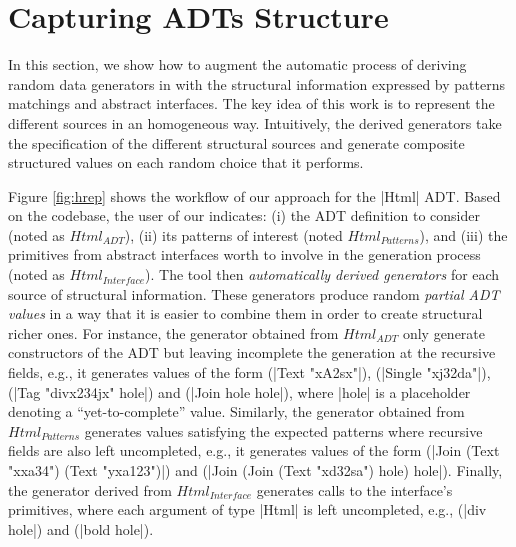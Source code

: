 \section{Capturing ADTs Structure} \label{sec:hrepcont}

\begin{figure*}[t]
  \centering
  
  \caption{Deriving a generator for the ADT |Html| with the structural
    information found in module |M|.}
  \label{fig:hrep}
\end{figure*}

In this section, we show how to augment the automatic process of deriving random
data generators in {\dragen} with the structural information expressed by
patterns matchings and abstract interfaces.
%
The key idea of this work is to represent the different sources in an
homogeneous way.
%
Intuitively, the derived generators take the specification of the different
structural sources and generate composite structured values on each random
choice that it performs.
%

Figure \ref{fig:hrep} shows the workflow of our approach for the |Html| ADT.
%
Based on the codebase, the user of our \dragenp indicates: (i) the ADT
definition to consider (noted as $Html_{ADT}$), (ii) its patterns of interest
(noted $Html_{Patterns}$), and (iii) the primitives from abstract interfaces
worth to involve in the generation process (noted as $Html_{Interface}$).
%
%
The tool then \emph{automatically derived generators} for each source of
structural information.
%
These generators produce random \emph{partial ADT values} in a way that it is
easier to combine them in order to create structural richer ones.
%
For instance, the generator obtained from $Html_{ADT}$ only generate
constructors of the ADT but leaving incomplete the generation at the recursive
fields, e.g., it generates values of the form (|Text "xA2sx"|), (|Single
"xj32da"|), (|Tag "divx234jx" hole|) and (|Join hole hole|), where |hole| is a
placeholder denoting a ``yet-to-complete'' value.
%
%
%
Similarly, the generator obtained from $Html_{Patterns}$ generates values
satisfying the expected patterns where recursive fields are also left
uncompleted, e.g., it generates values of the form (|Join (Text "xxa34") (Text
"yxa123")|) and (|Join (Join (Text "xd32sa") hole) hole|).
%
Finally, the generator derived from $Html_{Interface}$ generates calls to the
interface's primitives, where each argument of type |Html| is left uncompleted,
e.g., (|div hole|) and (|bold hole|).
%

